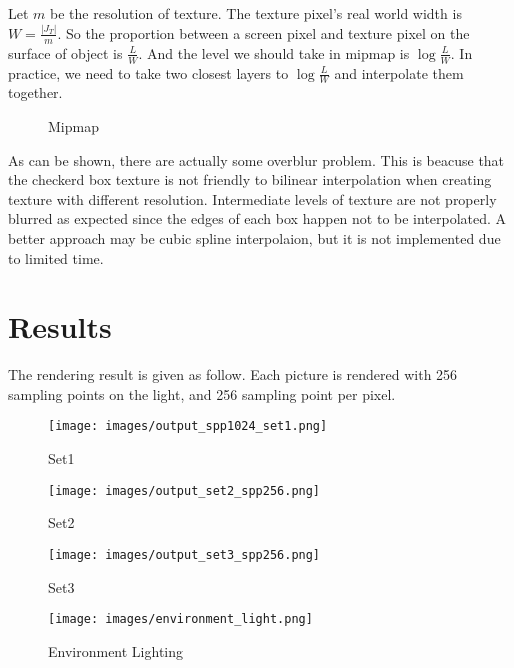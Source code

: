 \documentclass[acmtog]{acmart}
\begin{document}
Let $m$ be the resolution of texture. The texture pixel's real world width is $W = \frac{|J_T|}{m}$.
So the proportion between a screen pixel and texture pixel on the surface of object is $\frac{L}{W}$. And the level we should take in mipmap is $\log\frac{L}{W}$. In practice, we need to take two closest layers to $\log\frac{L}{W}$ and interpolate them together.
\begin{figure}[h]
    \centering
    \caption{Mipmap}
\end{figure}

As can be shown, there are actually some overblur problem. This is beacuse that the checkerd box texture is not friendly to bilinear interpolation when creating texture with different resolution. Intermediate levels of texture are not properly blurred as expected since the edges of each box happen not to be interpolated. A better approach may be cubic spline interpolaion, but it is not implemented due to limited time.

\section{Results}
The rendering result is given as follow. Each picture is rendered with 256 sampling points on the light, and 256 sampling point per pixel.

\begin{figure}[h]
    \centering
    \texttt{[image: images/output\_spp1024\_set1.png]}
    \caption{Set1}
\end{figure}

\begin{figure}[h]
    \centering
    \texttt{[image: images/output\_set2\_spp256.png]}
    \caption{Set2}
\end{figure}

\begin{figure}[h]
    \centering
    \texttt{[image: images/output\_set3\_spp256.png]}
    \caption{Set3}
\end{figure}

\begin{figure}[h]
    \centering
    \texttt{[image: images/environment\_light.png]}
    \caption{Environment Lighting}
\end{figure}
\end{document}
